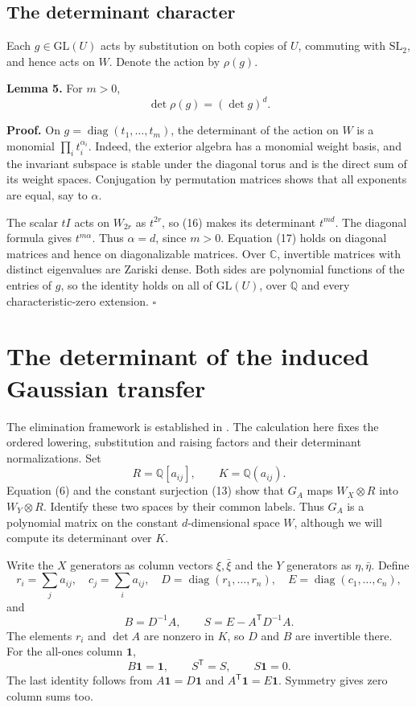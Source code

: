 \documentclass[11pt]{article}
\begin{document}
\subsection{The determinant character}\label{the-determinant-character}

Each \(g\in\mathrm{GL}(U)\) acts by substitution on both copies of \(U\), commuting with \(\mathrm{SL}_2\), and hence acts on \(W\). Denote the action by \(\rho(g)\).

\textbf{Lemma 5.} For \(m>0\), \[
\det\rho(g)=(\det g)^d.
\tag{17}
\]

\textbf{Proof.} On \(g=\operatorname{diag}(t_1,\ldots,t_m)\), the determinant of the action on \(W\) is a monomial \(\prod_i t_i^{\alpha_i}\). Indeed, the exterior algebra has a monomial weight basis, and the invariant subspace is stable under the diagonal torus and is the direct sum of its weight spaces. Conjugation by permutation matrices shows that all exponents are equal, say to \(\alpha\).

The scalar \(tI\) acts on \(W_{2r}\) as \(t^{2r}\), so (16) makes its determinant \(t^{md}\). The diagonal formula gives \(t^{m\alpha}\). Thus \(\alpha=d\), since \(m>0\). Equation (17) holds on diagonal matrices and hence on diagonalizable matrices. Over \(\mathbb C\), invertible matrices with distinct eigenvalues are Zariski dense. Both sides are polynomial functions of the entries of \(g\), so the identity holds on all of \(\mathrm{GL}(U)\), over \(\mathbb Q\) and every characteristic-zero extension. \(\square\)

\section{The determinant of the induced Gaussian transfer}\label{the-determinant-of-the-induced-gaussian-transfer}

The elimination framework is established in \cite[Section 5]{CSS}. The calculation here fixes the ordered lowering, substitution and raising factors and their determinant normalizations. Set \[
R=\mathbb Q[a_{ij}],\qquad K=\mathbb Q(a_{ij}).
\] Equation (6) and the constant surjection (13) show that \(G_A\) maps \(W_X\otimes R\) into \(W_Y\otimes R\). Identify these two spaces by their common labels. Thus \(G_A\) is a polynomial matrix on the constant \(d\)-dimensional space \(W\), although we will compute its determinant over \(K\).

Write the \(X\) generators as column vectors \(\xi,\bar\xi\) and the \(Y\) generators as \(\eta,\bar\eta\). Define \[
r_i=\sum_j a_{ij},\quad c_j=\sum_i a_{ij},\quad
D=\operatorname{diag}(r_1,\ldots,r_n),\quad
E=\operatorname{diag}(c_1,\ldots,c_n),
\] and \[
B=D^{-1}A,\qquad S=E-A^{\mathsf T}D^{-1}A.
\tag{18}
\] The elements \(r_i\) and \(\det A\) are nonzero in \(K\), so \(D\) and \(B\) are invertible there. For the all-ones column \(\mathbf1\), \[
B\mathbf1=\mathbf1,\qquad S^{\mathsf T}=S,\qquad S\mathbf1=0.
\tag{19}
\] The last identity follows from \(A\mathbf1=D\mathbf1\) and \(A^{\mathsf T}\mathbf1=E\mathbf1\). Symmetry gives zero column sums too.
\end{document}
